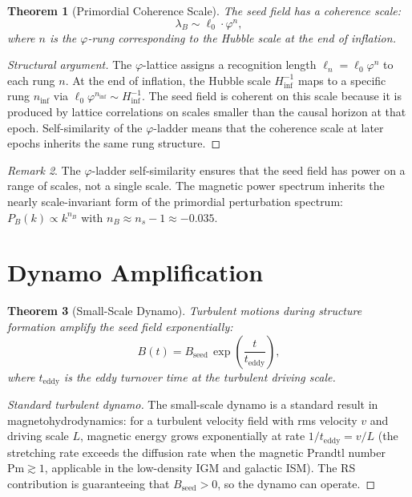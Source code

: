 \documentclass[12pt,a4paper]{article}
\newtheorem{theorem}{Theorem}[section]
\theoremstyle{definition}
\theoremstyle{remark}
\newtheorem{remark}[theorem]{Remark}
\begin{document}
\begin{theorem}[Primordial Coherence Scale]
The seed field has a coherence scale:
\begin{equation}
  \lambda_B \sim \ell_0 \cdot \varphi^n,
\end{equation}
where $n$ is the $\varphi$-rung corresponding to the Hubble scale
at the end of inflation.
\end{theorem}

\begin{proof}[Structural argument]
The $\varphi$-lattice assigns a recognition length $\ell_n = \ell_0 \varphi^n$
to each rung $n$.  At the end of inflation, the Hubble scale
$H_{\mathrm{inf}}^{-1}$ maps to a specific rung $n_{\mathrm{inf}}$
via $\ell_0 \varphi^{n_{\mathrm{inf}}} \sim H_{\mathrm{inf}}^{-1}$.
The seed field is coherent on this scale because it is produced by
lattice correlations on scales smaller than the causal horizon at
that epoch.  Self-similarity of the $\varphi$-ladder means that
the coherence scale at later epochs inherits the same rung structure.
\end{proof}

\begin{remark}
The $\varphi$-ladder self-similarity ensures that the seed field
has power on a range of scales, not a single scale.  The magnetic
power spectrum inherits the nearly scale-invariant form of the
primordial perturbation spectrum:
$P_B(k) \propto k^{n_B}$ with $n_B \approx n_s - 1 \approx -0.035$.
\end{remark}

\section{Dynamo Amplification}
\label{sec:dynamo}

\begin{theorem}[Small-Scale Dynamo]
Turbulent motions during structure formation amplify the seed field
exponentially:
\begin{equation}
  B(t) = B_{\mathrm{seed}}\,\exp\!\left(\frac{t}{t_{\mathrm{eddy}}}
  \right),
\end{equation}
where $t_{\mathrm{eddy}}$ is the eddy turnover time at the
turbulent driving scale.
\end{theorem}

\begin{proof}[Standard turbulent dynamo]
The small-scale dynamo is a standard result in magnetohydrodynamics:
for a turbulent velocity field with rms velocity $v$ and driving
scale $L$, magnetic energy grows exponentially at rate
$1/t_{\mathrm{eddy}} = v/L$ (the stretching rate exceeds the
diffusion rate when the magnetic Prandtl number $\mathrm{Pm} \gtrsim 1$,
applicable in the low-density IGM and galactic ISM).  The RS
contribution is guaranteeing that $B_{\mathrm{seed}} > 0$, so the
dynamo can operate.
\end{proof}
\end{document}
